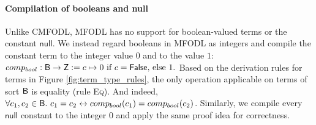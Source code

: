 \paragraph{Compilation of booleans and null}
\label{sec:compilation_of_bools}
Unlike CMFODL, MFODL has no support for boolean-valued terms or the constant $\mathsf{null}$. We instead regard booleans in MFODL as integers and compile the constant term  to the integer value $0$ and  to the value $1$: $comp_{bool} : \mathsf{B} \to \mathsf{Z} := c \mapsto 0 \text{ if } c = \mathsf{False} \text{, else } 1.$ Based on the derivation rules for terms in Figure \ref{fig:term_type_rules}, the only operation applicable on terms of sort $\mathsf{B}$ is equality (rule \textsc{Eq}). And indeed, $\forall c_1, c_2 \in \mathsf{B} .\ c_1 = c_2 \leftrightarrow comp_{bool}(c_1) = comp_{bool}(c_2)$. Similarly, we compile every $\mathsf{null}$ constant to the integer $0$ and apply the same proof idea for correctness.



